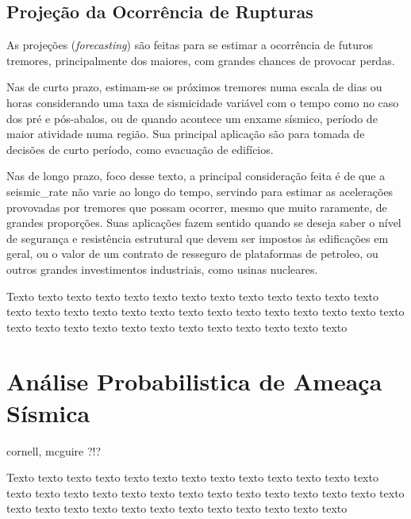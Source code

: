  
\subsection{Projeção da Ocorrência de Rupturas}
\label{sec:fundamentos}

As projeções (\textit{forecasting}) são feitas para se estimar a ocorrência de futuros tremores,
principalmente dos maiores, com grandes chances de provocar perdas.

Nas de curto prazo, estimam-se os próximos tremores
numa escala de dias ou horas considerando uma taxa de sismicidade variável 
com o tempo como no caso dos pré e pós-abalos, ou de quando 
acontece um enxame sísmico, período de maior atividade numa região.
Sua principal aplicação são para tomada de decisões de curto período, 
como evacuação de edifícios.

Nas de longo prazo, foco desse texto, a principal consideração feita é de que a 
\gls{seismic_rate} não varie ao longo do tempo, servindo para estimar as acelerações 
provovadas por tremores que possam ocorrer,
mesmo que muito raramente, de grandes proporções. Suas aplicações fazem sentido quando
se deseja saber o nível de segurança e resistência estrutural que devem ser impostos 
às edificações em geral, ou o valor de um contrato de resseguro de plataformas de petroleo,
ou outros grandes investimentos industriais, como usinas nucleares.



Texto texto texto texto texto texto texto texto texto texto texto texto texto
texto texto texto texto texto texto texto texto texto texto texto texto texto
texto texto texto texto texto texto texto texto texto texto texto texto texto



\section{Análise Probabilistica de Ameaça Sísmica}
\label{sec:psha}


cornell, mcguire ?!?


Texto texto texto texto texto texto texto texto texto texto texto texto texto
texto texto texto texto texto texto texto texto texto texto texto texto texto
texto texto texto texto texto texto texto texto texto texto texto texto texto



